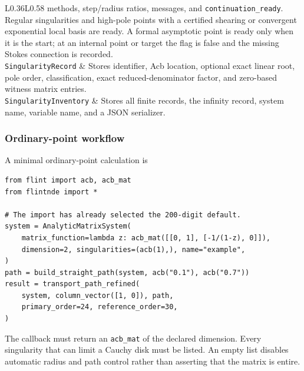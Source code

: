 \documentclass[11pt]{article}
\begin{document}
\begin{longtable}{L{0.36\textwidth}L{0.58\textwidth}}
methods, step/radius ratios, messages, and \texttt{continuation\_ready}.  Regular singularities
and high-pole points with a certified shearing or convergent exponential local basis are
ready.  A formal asymptotic point is ready only when it is the start; at an internal point or
target the flag is false and the missing Stokes connection is recorded. \\
\texttt{SingularityRecord} & Stores identifier, Acb location, optional exact linear root,
pole order, classification, exact reduced-denominator factor, and zero-based witness matrix
entries. \\
\texttt{SingularityInventory} & Stores all finite records, the infinity record, system name,
variable name, and a JSON serializer. \\
\bottomrule
\end{longtable}
\normalsize

\subsubsection{Ordinary-point workflow}
\label{subsec:transport-api}

A minimal ordinary-point calculation is
\begin{verbatim}
from flint import acb, acb_mat
from flintnde import *

# The import has already selected the 200-digit default.
system = AnalyticMatrixSystem(
    matrix_function=lambda z: acb_mat([[0, 1], [-1/(1-z), 0]]),
    dimension=2, singularities=(acb(1),), name="example",
)
path = build_straight_path(system, acb("0.1"), acb("0.7"))
result = transport_path_refined(
    system, column_vector([1, 0]), path,
    primary_order=24, reference_order=30,
)
\end{verbatim}
The callback must return an \texttt{acb\_mat} of the declared dimension.  Every singularity
that can limit a Cauchy disk must be listed.  An empty list disables automatic radius and
path control rather than asserting that the matrix is entire.
\end{document}
